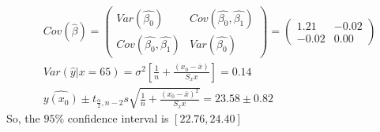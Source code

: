 \documentclass[11pt]{article}
\begin{document}
    \\
    \begin{align*}
      &Cov(\hat{\beta}) =
      \begin{pmatrix}
        Var(\hat{\beta_0}) & Cov(\hat{\beta_0},\hat{\beta_1}) \\
        Cov(\hat{\beta_0},\hat{\beta_1}) & Var(\hat{\beta_0})
      \end{pmatrix}
      =
      \begin{pmatrix}
        1.21 & -0.02\\
        -0.02 & 0.00
      \end{pmatrix} \\
      &Var(\hat{y}|x = 65) = \sigma^2 [\frac{1}{n} + \frac{(x_0 - \overline{x})}{S_xx}] = 0.14 \\
      &\hat{y(x_0)} \pm t_{\frac{\alpha}{2}, n-2} s \sqrt{\frac{1}{n} + \frac{(x_0 - \overline{x})^2}{S_xx}} = 23.58 \pm 0.82
    \end{align*}
    So, the $95\%$ confidence interval is $[22.76,24.40]$
\end{document}
